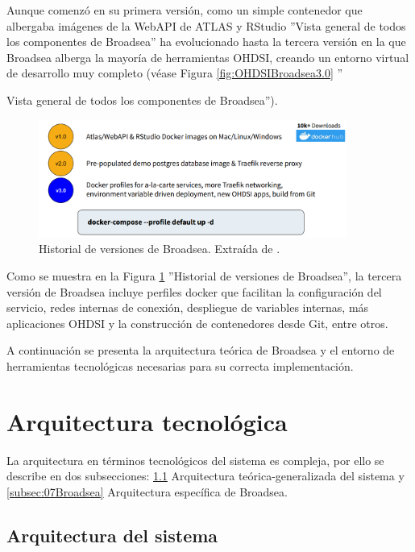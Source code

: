 Aunque comenzó en su primera versión, como un simple contenedor que albergaba imágenes de la WebAPI de ATLAS y RStudio \cite{Broadsea3PPTX} ''Vista general de todos los componentes de Broadsea'' ha evolucionado hasta la tercera versión en la que Broadsea alberga la mayoría de herramientas OHDSI, creando un entorno virtual de desarrollo muy completo (véase Figura \ref{fig:OHDSIBroadsea3.0} ''{Vista general de todos los componentes de Broadsea''). 

\begin{figure}[H]
    \centering
    \includegraphics[width=0.90\textwidth]{figures/versionesBroadsea.png}
    \caption{Historial de versiones de Broadsea. Extraída de \cite{Broadsea3PPTX}.}
    \label{fig:versionesBroadsea}
\end{figure}

Como se muestra en la Figura \ref{fig:versionesBroadsea} ''Historial de versiones de Broadsea'', la tercera versión de Broadsea incluye perfiles docker que facilitan la configuración del servicio, redes internas de conexión, despliegue de variables internas, más aplicaciones OHDSI y la construcción de contenedores desde Git, entre otros. 

A continuación se presenta la arquitectura teórica de Broadsea y el entorno de herramientas tecnológicas necesarias para su correcta implementación.

\section{Arquitectura tecnológica} \label{sec:07arqTecno}

La arquitectura en términos tecnológicos del sistema es compleja, por ello se describe en dos subsecciones: \ref{subsec:07sistema} Arquitectura teórica-generalizada del sistema y \ref{subsec:07Broadsea} Arquitectura específica de Broadsea.

\subsection{Arquitectura del sistema}\label{subsec:07sistema}

}
